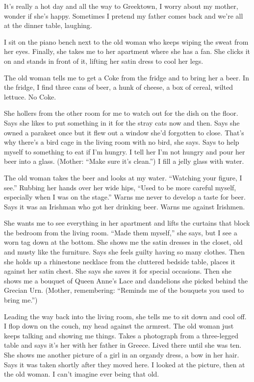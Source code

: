 \documentclass[twoside,10pt]{book}
\begin{document}
It's really a hot day and all the way to Greektown, I worry about my
mother, wonder if she's happy. Sometimes I pretend my father comes back
and we're all at the dinner table, laughing.

I sit on the piano bench next to the old woman who keeps wiping the
sweat from her eyes. Finally, she takes me to her apartment where she
has a fan. She clicks it on and stands in front of it, lifting her satin
dress to cool her legs.

The old woman tells me to get a Coke from the fridge and to bring her a
beer. In the fridge, I find three cans of beer, a hunk of cheese, a box
of cereal, wilted lettuce. No Coke.

She hollers from the other room for me to watch out for the dish on the
floor. Says she likes to put something in it for the stray cats now and
then. Says she owned a parakeet once but it flew out a window she'd
forgotten to close. That's why there's a bird cage in the living room
with no bird, she says. Says to help myself to something to eat if I'm
hungry. I tell her I'm not hungry and pour her beer into a glass.
(Mother: ``Make sure it's clean.'') I fill a jelly glass with water.

The old woman takes the beer and looks at my water. ``Watching your
figure, I see.'' Rubbing her hands over her wide hips, ``Used to be more
careful myself, especially when I was on the stage.'' Warns me never to
develop a taste for beer. Says it was an Irishman who got her drinking
beer. Warns me against Irishmen.

She wants me to see everything in her apartment and lifts the curtains
that block the bedroom from the living room. ``Made them myself,'' she
says, but I see a worn tag down at the bottom. She shows me the satin
dresses in the closet, old and musty like the furniture. Says she feels
guilty having so many clothes. Then she holds up a rhinestone necklace
from the cluttered bedside table, places it against her satin chest. She
says she saves it for special occasions. Then she shows me a bouquet of
Queen Anne's Lace and dandelions she picked behind the Grecian Urn.
(Mother, remembering: ``Reminds me of the bouquets you used to bring
me.'')

Leading the way back into the living room, she tells me to sit down and
cool off. I flop down on the couch, my head against the armrest. The old
woman just keeps talking and showing me things. Takes a photograph from
a three-legged table and says it's her with her father in Greece. Lived
there until she was ten. She shows me another picture of a girl in an
organdy dress, a bow in her hair. Says it was taken shortly after they
moved here. I looked at the picture, then at the old woman. I can't
imagine ever being that old.
\end{document}
